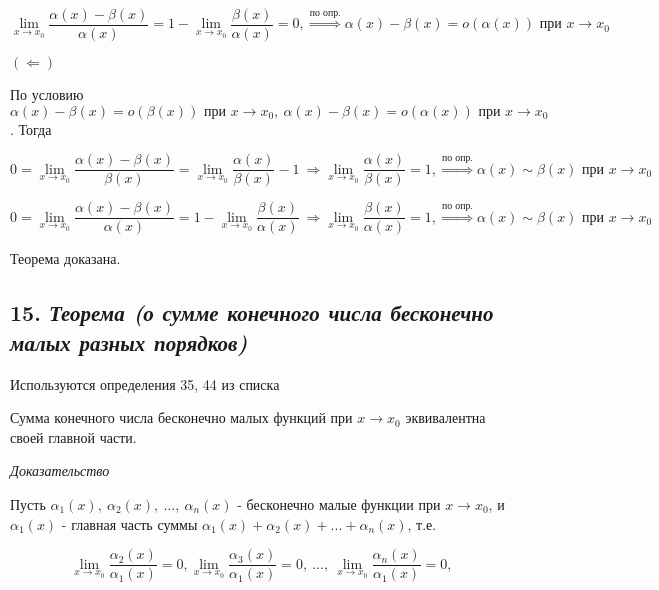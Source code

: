 $$
\lim\limits_{x \to x_0}{\dfrac{\alpha(x) - \beta(x)}{\alpha(x)}} = 1 - \lim\limits_{x \to x_0}{\dfrac{\beta(x)}{\alpha(x)}} = 0, \overset{\text{по опр.}}\Rightarrow \alpha(x) - \beta(x) = o (\alpha(x)) \text{ при } x \rightarrow x_0
$$

$(\Leftarrow)$

По условию $\alpha(x) - \beta(x) = o (\beta(x)) \text{ при } x \rightarrow x_0, \ \alpha(x) - \beta(x) = o (\alpha(x)) \text{ при } x \rightarrow x_0$. Тогда

$$
0 = \lim\limits_{x \to x_0}{\dfrac{\alpha(x) - \beta(x)}{\beta(x)}} = \lim\limits_{x \to x_0}{\dfrac{\alpha(x)}{\beta(x)}} - 1 \ \Rightarrow \lim\limits_{x \to x_0}{\dfrac{\alpha(x)}{\beta(x)}} = 1, \overset{\text{по опр.}}\Rightarrow \alpha(x) \sim \beta(x) \text{ при } x \rightarrow x_0
$$

$$
0 = \lim\limits_{x \to x_0}{\dfrac{\alpha(x) - \beta(x)}{\alpha(x)}} = 1 - \lim\limits_{x \to x_0}{\dfrac{\beta(x)}{\alpha(x)}} \ \Rightarrow \lim\limits_{x \to x_0}{\dfrac{\beta(x)}{\alpha(x)}} = 1, \overset{\text{по опр.}}\Rightarrow \alpha(x) \sim \beta(x) \text{ при } x \rightarrow x_0
$$

Теорема доказана.
\newpage 
\subsection*{15. \textit{Теорема (о сумме конечного числа бесконечно малых разных порядков)}}
\begin{Quote2} 
\small\centering 

Используются определения 35, 44 из списка \end{Quote2} 

Сумма конечного числа бесконечно малых функций при $x \rightarrow x_0$ эквивалентна своей главной части.
\vspace*{20pt} 

\textit{Доказательство}

Пусть $\alpha_1(x), \ \alpha_2(x), \ ..., \ \alpha_n(x)$ - бесконечно малые функции при $x \rightarrow x_0$, и $\alpha_1(x)$ - главная часть суммы $\alpha_1(x) + \alpha_2(x) + ... +  \alpha_n(x)$, т.е.

$$
\lim\limits_{x \to x_0}\dfrac{\alpha_2(x)}{\alpha_1(x)} = 0, \lim\limits_{x \to x_0}\dfrac{\alpha_3(x)}{\alpha_1(x)} = 0, \ ...,\ \lim\limits_{x \to x_0}\dfrac{\alpha_n(x)}{\alpha_1(x)} = 0, 
$$

